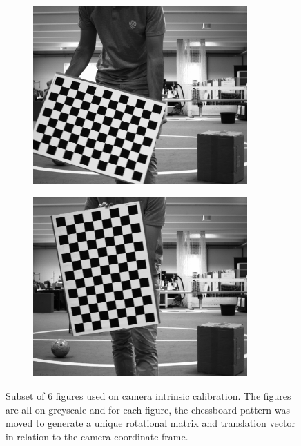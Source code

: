 \begin{figure}[!ht]
\begin{subfigure}[c]{0.30\textwidth}
		\includegraphics[width=0.9\textwidth]{img/camera-calibration/left-0044.png}
	\end{subfigure}
	\begin{subfigure}[c]{0.30\textwidth}
		\includegraphics[width=0.9\textwidth]{img/camera-calibration/left-0048.png}
	\end{subfigure}
	
	\caption[Subset of figures used for intrinsic camera calibration.]{Subset of 6 figures used on camera intrinsic calibration. The figures are all on greyscale and for each figure, the chessboard pattern was moved to generate a unique rotational matrix and translation vector in relation to the camera coordinate frame.}
	\label{fig:camera-calibration-images}
\end{figure}

